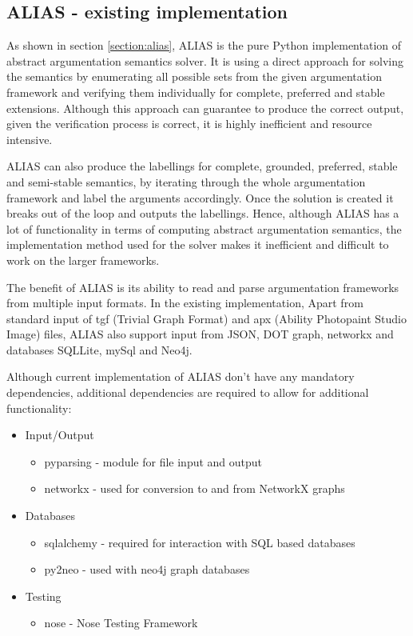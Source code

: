 \subsection{ALIAS - existing implementation}
As shown in section \ref{section:alias}, ALIAS \citep{alias} is the pure Python implementation of abstract argumentation semantics solver. It is using a direct approach for solving the semantics by enumerating all possible sets from the given argumentation framework and verifying them individually for complete, preferred and stable extensions. Although this approach can guarantee to produce the correct output, given the verification process is correct, it is highly inefficient and resource intensive. 

ALIAS can also produce the labellings for complete, grounded, preferred, stable and semi-stable semantics, by iterating through the whole argumentation framework and label the arguments accordingly. Once the solution is created it breaks out of the loop and outputs the labellings. Hence, although ALIAS has a lot of functionality in terms of computing abstract argumentation semantics, the implementation method used for the solver makes it inefficient and difficult to work on the larger frameworks. 

The benefit of ALIAS is its ability to read and parse argumentation frameworks from multiple input formats. In the existing implementation, Apart from standard input of tgf (Trivial Graph Format) and apx (Ability Photopaint Studio Image) files, ALIAS also support input from JSON, DOT graph, networkx and databases SQLLite, mySql and Neo4j. 

Although current implementation of ALIAS don't have any mandatory dependencies, additional dependencies are required to allow for additional functionality:
\begin{itemize}
	\item Input/Output
	\begin{itemize}
		\item pyparsing - module for file input and output
		\item networkx - used for conversion to and from NetworkX graphs 
	\end{itemize}
	\item Databases
	\begin{itemize}
		\item sqlalchemy - required for interaction with SQL based databases
		\item py2neo - used with neo4j graph databases
	\end{itemize}
	\item Testing
	\begin{itemize}
		\item nose - Nose Testing Framework
	\end{itemize}
\end{itemize}

